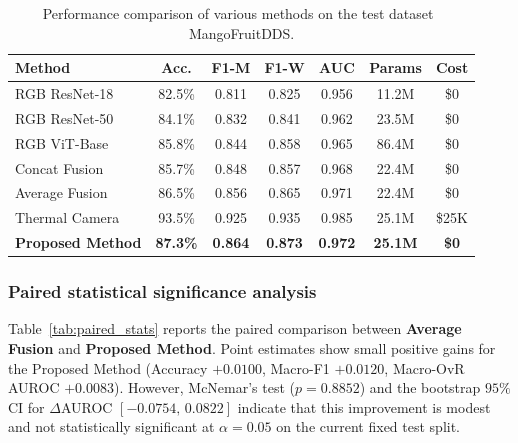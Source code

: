 \documentclass[utf8]{FrontiersinHarvard} %
\begin{document}
\begin{table}[h!]
    \caption{Performance comparison of various methods on the test dataset MangoFruitDDS. }
    \label{tab:performance}
    \raggedright
    \scriptsize
    \begin{tabular}{lcccccc}
        \toprule
        \textbf{Method} & \textbf{Acc.} & \textbf{F1-M} & \textbf{F1-W} & \textbf{AUC} & \textbf{Params} & \textbf{Cost} \\
        \midrule
        RGB ResNet-18 & 82.5\% & 0.811 & 0.825 & 0.956 & 11.2M & \$0 \\
        RGB ResNet-50 & 84.1\% & 0.832 & 0.841 & 0.962 & 23.5M & \$0 \\
        RGB ViT-Base & 85.8\% & 0.844 & 0.858 & 0.965 & 86.4M & \$0 \\
        Concat Fusion & 85.7\% & 0.848 & 0.857 & 0.968 & 22.4M & \$0 \\
        Average Fusion & 86.5\% & 0.856 & 0.865 & 0.971 & 22.4M & \$0 \\
        Thermal Camera & 93.5\% & 0.925 & 0.935 & 0.985 & 25.1M & \$25K \\
        \textbf{Proposed Method} & \textbf{87.3\%} & \textbf{0.864} & \textbf{0.873} & \textbf{0.972} & \textbf{25.1M} & \textbf{\$0} \\
        \bottomrule
    \end{tabular}
\end{table}

\subsubsection{Paired statistical significance analysis}
\label{sec:paired_stat_table}
Table~\ref{tab:paired_stats} reports the paired comparison between \textbf{Average Fusion} and \textbf{Proposed Method}. Point estimates show small positive gains for the Proposed Method (Accuracy \(+0.0100\), Macro-F1 \(+0.0120\), Macro-OvR AUROC \(+0.0083\)). However, McNemar's test (\(p=0.8852\)) and the bootstrap \(95\%\) CI for \(\Delta\)AUROC \(\left[-0.0754,\,0.0822\right]\) indicate that this improvement is modest and not statistically significant at \(\alpha=0.05\) on the current fixed test split.
\end{document}
